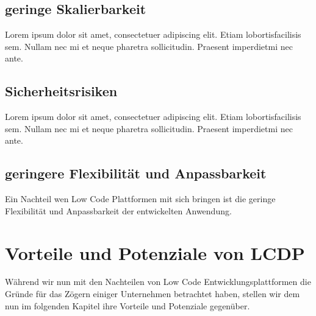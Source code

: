\documentclass[12pt]{article} %
\begin{document}
	\subsection{geringe Skalierbarkeit}	
	Lorem  ipsum  dolor  sit  amet,  consectetuer  adipiscing  
	elit.   Etiam  lobortisfacilisis sem.  Nullam nec mi et 
	neque pharetra sollicitudin.  Praesent imperdietmi nec ante.
	
	\subsection{Sicherheitsrisiken}	
	Lorem  ipsum  dolor  sit  amet,  consectetuer  adipiscing  
	elit.   Etiam  lobortisfacilisis sem.  Nullam nec mi et 
	neque pharetra sollicitudin.  Praesent imperdietmi nec ante.  
	
	\subsection{geringere Flexibilität und Anpassbarkeit}	
	Ein Nachteil wen Low Code Plattformen mit sich bringen ist die geringe Flexibilität und Anpassbarkeit der entwickelten Anwendung. %
	
	
	\section{Vorteile  und Potenziale von LCDP}
	Während wir nun mit den Nachteilen von Low Code Entwicklungsplattformen die Gründe für das Zögern einiger Unternehmen betrachtet haben, stellen wir dem nun im folgenden Kapitel ihre Vorteile und Potenziale gegenüber.
	
	
\end{document}
